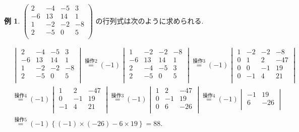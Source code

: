 \documentclass[dvipdfmx,a4paper,11pt]{article}
\theoremstyle{definition}
\newtheorem{exa}[thm]{例}
\begin{document}
 \begin{exa}
 $
 \begin{pmatrix}
 2&-4&-5&3\\
 -6&13&14&1\\
 1&-2&-2&-8\\
 2&-5&0&5\\
 \end{pmatrix}
$
の行列式は次のように求められる. 

\begin{align*}
 &\begin{vmatrix}
 2&-4&-5&3\\
 -6&13&14&1\\
 1&-2&-2&-8\\
 2&-5&0&5\\
 \end{vmatrix}
 \overset{\text{操作2}} {=}
 (-1)
  \begin{vmatrix}
   1&-2&-2&-8\\
 -6&13&14&1\\
 2&-4&-5&3\\
 2&-5&0&5\\
 \end{vmatrix}
  \overset{\text{操作3}}  {=}
 (-1)
  \begin{vmatrix}
   1&-2&-2&-8\\
 0&1 &2  &-47\\
 0& 0&-1&19\\
 0&-1&4&21\\
 \end{vmatrix}
\\ %
& \overset{\text{操作4}} {=}
 (-1)
  \begin{vmatrix}
1 &2  &-47\\
 0&-1&19\\
-1&4&21\\
 \end{vmatrix}
  \overset{\text{操作3}} {=}
   (-1)
  \begin{vmatrix}
1 &2  &-47\\
 0&-1&19\\
 0&6&-26\\
 \end{vmatrix}
 \overset{\text{操作4}} {=}
  (-1)
    \begin{vmatrix}
-1&19\\
6&-26\\
 \end{vmatrix}
 \\ %
 & \overset{\text{操作5} } {=}
 (-1)\left\{(-1)\times (-26) - 6\times 19\right\} = 88.
\end{align*}
 \end{exa}
\end{document}

